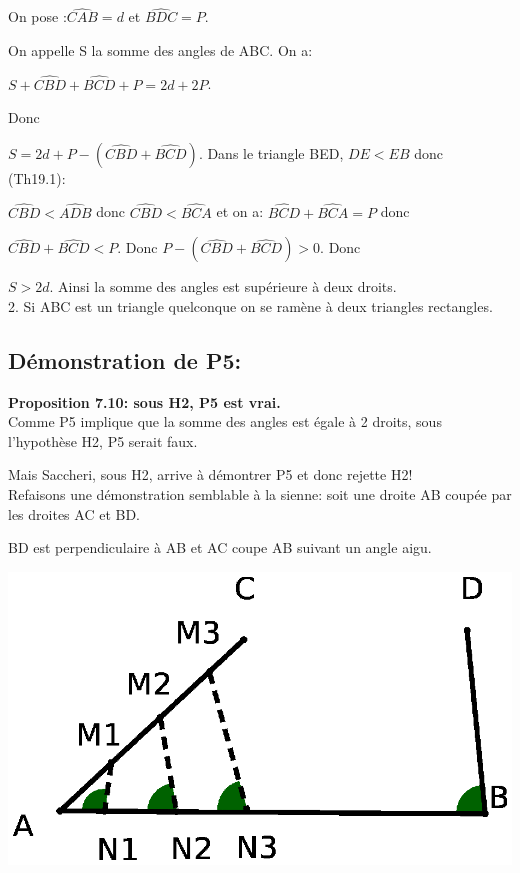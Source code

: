 \documentclass[a4paper, 12pt, twoside]{book}
\begin{document}
      On pose :$\hat{CAB}=d$ et $\hat{BDC}=P$.\
      
    On appelle S la somme des angles de ABC. On a:\
  
   
     $S+\hat{CBD}+\hat{BCD}+P=2d+2P$.\
       
 
    
    Donc\
     
     $S=2d+P-(\hat{CBD}+\hat{BCD})$. Dans le triangle BED, $DE<EB$ donc (Th19.1):\
     
    $\hat{CBD}<\hat{ADB}$ donc $\hat{CBD}<\hat{BCA}$ et on a:  $\hat{BCD}+\hat{BCA}=P$ donc\
     
  $\hat{CBD}+\hat{BCD}<P$. Donc  $P-(\hat{CBD}+\hat{BCD})>0$. Donc\
  
  $S>2d$. Ainsi la somme des angles est supérieure à deux droits.\\
  
  2. Si ABC est un triangle quelconque on se ramène à deux triangles rectangles.\\ 
 
 \subsection{Démonstration de P5:}
         
  \textbf{Proposition 7.10: sous H2, P5 est vrai.}\\
     
     
    
 Comme P5 implique que la somme des angles est égale à 2 droits, sous l'hypothèse H2, P5 serait faux.\
 
 Mais Saccheri, sous H2, arrive à démontrer P5 et donc rejette H2! \\
 
 
 Refaisons une démonstration semblable à la sienne: soit une droite AB coupée par les droites AC et BD. \
 
 BD est perpendiculaire à AB et AC coupe AB suivant un angle aigu.\
 
  \includegraphics[scale=0.7]{figures/sacc11.eps} \
  
\end{document}
